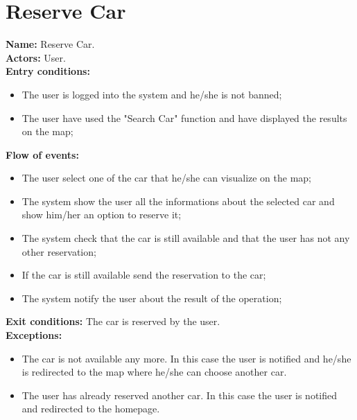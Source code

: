 \section*{Reserve Car}
\textbf{Name:} Reserve Car.\\
\textbf{Actors:} User.\\
\textbf{Entry conditions:}
\begin{itemize}
\item The user is logged into the system and he/she is not banned;
\item The user have used the "Search Car" function and have displayed the results on the map;
\end{itemize}
\textbf{Flow of events:}
\begin{itemize}
\item The user select one of the car that he/she can visualize on the map;
\item The system show the user all the informations about the selected car and show him/her an option to reserve it;
\item The system check that the car is still available and that the user has not any other reservation;
\item If the car is still available send the reservation to the car;
\item The system notify the user about the result of the operation;
\end{itemize}
\textbf{Exit conditions:} The car is reserved by the user.\\
\textbf{Exceptions:}
\begin{itemize}
\item The car is not available any more. In this case the user is notified and he/she is redirected to the map where he/she can choose another car.
\item The user has already reserved another car. In this case the user is notified and redirected to the homepage.
\end{itemize}


